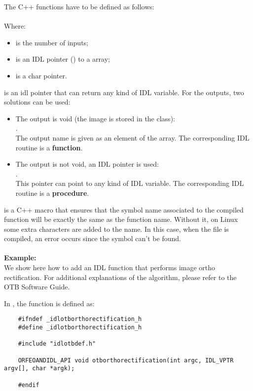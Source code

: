 The C++ functions have to be defined as follows:\\
\\
Where:
\begin{itemize}
    \item {} is the number of inputs;
    \item {} is an IDL pointer () to a  array;
    \item {} is a char pointer.
\end{itemize}
 is an idl pointer that can return any kind of IDL variable.
For the outputs, two solutions can be used:
\begin{itemize}
\item The output is void (the image is stored in the class): \\ 
.\\
  The output name is given as an element of the  array. The corresponding IDL routine is a \textbf{function}.
\item The output is not void, an IDL pointer is used: \\ 
.\\
  This pointer can point to any kind of IDL variable. The corresponding IDL routine is a \textbf{procedure}.
\end{itemize}
 is a C++ macro that ensures that the symbol name associated to the compiled function will be exactly the same as the function name. Without it, 
on Linux some extra characters are added to the name. In this case, when the  file is compiled, an error occurs since the symbol can't be found. \\
\\
\textbf{Example:}\\
      We show here how to add an IDL function that performs image ortho rectification. For additional explanations of the algorithm, please refer to the OTB Software Guide.

      In , the function is defined as:
\begin{verbatim}
    #ifndef _idlotborthorectification_h
    #define _idlotborthorectification_h

    #include "idlotbdef.h"

    ORFEOANDIDL_API void otborthorectification(int argc, IDL_VPTR argv[], char *argk);

    #endif

\end{verbatim}

